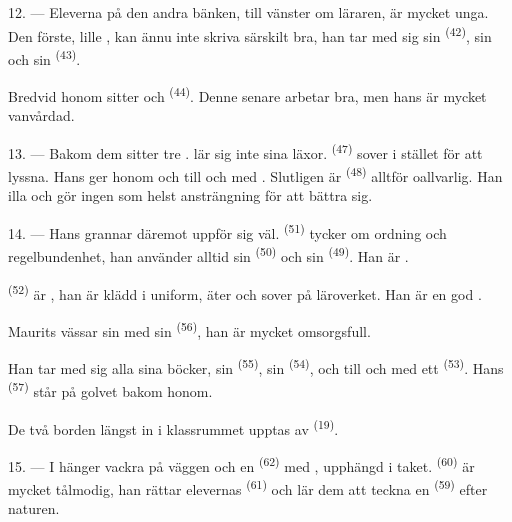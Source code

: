12. --- Eleverna på den andra bänken, till vänster om läraren, är mycket unga. Den förste,
lille , kan ännu inte skriva särskilt bra, han tar med sig sin
 \textsuperscript{(42)}, sin  och sin 
\textsuperscript{(43)}.

Bredvid honom sitter  och  \textsuperscript{(44)}. Denne
senare arbetar bra, men hans  är mycket vanvårdad.

13. --- Bakom dem sitter tre .  lär sig inte sina läxor.
 \textsuperscript{(47)} sover i stället för att lyssna. Hans  ger
honom  och till och med
. Slutligen är  \textsuperscript{(48)} alltför
oallvarlig. Han  illa och gör ingen som helst ansträngning för att bättra
sig.

14. --- Hans grannar däremot uppför sig väl.  \textsuperscript{(51)} tycker om
ordning och regelbundenhet, han använder alltid sin  \textsuperscript{(50)} och
sin  \textsuperscript{(49)}. Han är .

 \textsuperscript{(52)} är , han är klädd i
uniform, äter och sover på läroverket. Han är en god .

Maurits vässar sin  med sin  \textsuperscript{(56)}, han
är mycket omsorgsfull.

Han tar med sig alla sina böcker, sin  \textsuperscript{(55)}, sin
 \textsuperscript{(54)}, och till och med ett 
\textsuperscript{(53)}. Hans
 \textsuperscript{(57)} står på golvet bakom honom.

De två borden längst in i klassrummet upptas av  \textsuperscript{(19)}.

\VUsaut{4.6mm}
\VUsaut{3.4mm}

15. --- I  hänger vackra  på väggen och en
 \textsuperscript{(62)} med , upphängd i taket.
 \textsuperscript{(60)} är mycket tålmodig, han rättar elevernas
 \textsuperscript{(61)} och lär dem att teckna en
 \textsuperscript{(59)} efter naturen.

